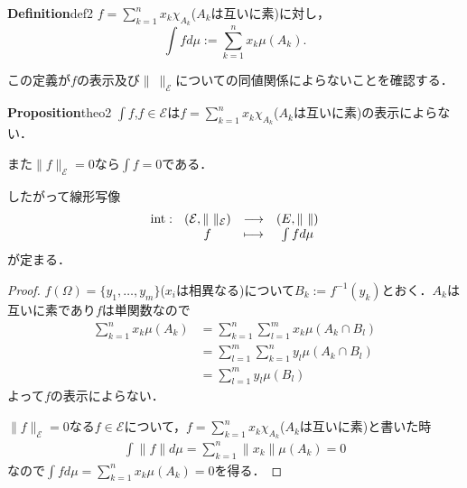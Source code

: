 \documentclass[dvipdfmx,autodetect-engine]{jbook}
\begin{document}
  \begin{mydef}{\textbf{Definition}}{def2}
    $f=\sum_{k=1}^{n}x_k \chi_{A_k}$($A_k$は互いに素)に対し，
    \begin{equation*}
      \int f d\mu := \sum_{k=1}^{n}x_k \mu\left(A_k\right).
    \end{equation*}
  \end{mydef}

  この定義が$f$の表示及び$\|\ \|_{\mathcal{E}}$についての同値関係によらないことを確認する．

  \begin{mytheo}{\textbf{Proposition}}{theo2}
    $\int f$,$f\in \mathcal{E}$は$f=\sum_{k=1}^{n}x_k \chi_{A_k}$($A_{k}$は互いに素)の表示によらない．　\par
    また$\|f\|_{\mathcal{E}}=0$なら$\int f=0$である．\par
    したがって線形写像
    \begin{equation*}
      \begin{array}{ccc}
          \rm{int}:\ \ (\mathcal{E},\|\ \|_{\mathcal{E}}) & {\longrightarrow} & (E,\|\ \|) \\
           \ \ \ \ \ \ \ \ f & \longmapsto & \int fd\mu
      \end{array}
    \end{equation*}
    が定まる．
  \end{mytheo}
  \begin{proof}
    $f(\Omega)=\{y_1,\ldots,y_m\}$($x_i$は相異なる)について$B_k:=f^{-1}(y_k)$とおく．$A_{k}$は互いに素であり$f$は単関数なので
    \begin{align*}
      \sum_{k=1}^{n}x_k \mu\left(A_k\right) &= \sum_{k=1}^{n} \sum_{l=1}^{m} x_k \mu\left(A_k\cap B_l\right) \\
                                            &= \sum_{l=1}^{m} \sum_{k=1}^{n} y_l \mu\left(A_k\cap B_l\right) \\
                                            &= \sum_{l=1}^{m} y_l \mu\left(B_l\right)
    \end{align*}
    よって$f$の表示によらない．\par
    $\|f\|_{\mathcal{E}}=0$なる$f\in\mathcal{E}$について，$f=\sum_{k=1}^{n}x_k \chi_{A_k}$($A_{k}$は互いに素)と書いた時
    \begin{align*}
      \int \|f\| d\mu = \sum_{k=1}^{n}\|x_k\|\mu\left(A_k\right) = 0
    \end{align*}
    なので$\int f d\mu = \sum_{k=1}^{n}x_k\mu\left(A_k\right)=0$を得る．
  \end{proof}
\end{document}
